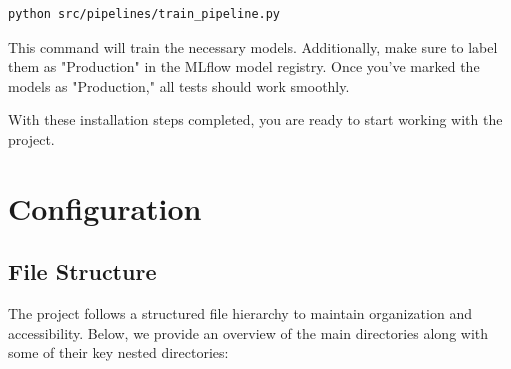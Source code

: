 \documentclass{report}
\begin{document}
\begin{verbatim}
python src/pipelines/train_pipeline.py
\end{verbatim}

This command will train the necessary models. Additionally, make sure to label them as "Production" in the MLflow model registry. Once you've marked the models as "Production," all tests should work smoothly.

With these installation steps completed, you are ready to start working with the project.




\chapter{Configuration} \label{chap:configuration}
\section{File Structure}

The project follows a structured file hierarchy to maintain organization and accessibility. Below, we provide an overview of the main directories along with some of their key nested directories:
\end{document}
